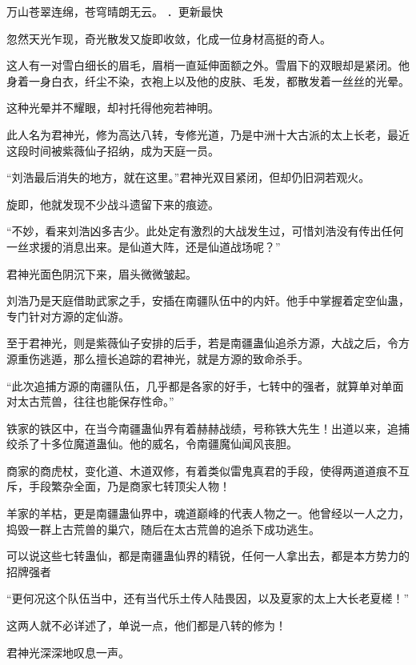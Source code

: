 
\begin{this_body}



万山苍翠连绵，苍穹晴朗无云。 ．更新最快

忽然天光乍现，奇光散发又旋即收敛，化成一位身材高挺的奇人。

这人有一对雪白细长的眉毛，眉梢一直延伸面额之外。雪眉下的双眼却是紧闭。他身着一身白衣，纤尘不染，衣袍上以及他的皮肤、毛发，都散发着一丝丝的光晕。

这种光晕并不耀眼，却衬托得他宛若神明。

此人名为君神光，修为高达八转，专修光道，乃是中洲十大古派的太上长老，最近这段时间被紫薇仙子招纳，成为天庭一员。

“刘浩最后消失的地方，就在这里。”君神光双目紧闭，但却仍旧洞若观火。

旋即，他就发现不少战斗遗留下来的痕迹。

“不妙，看来刘浩凶多吉少。此处定有激烈的大战发生过，可惜刘浩没有传出任何一丝求援的消息出来。是仙道大阵，还是仙道战场呢？”

君神光面色阴沉下来，眉头微微皱起。

刘浩乃是天庭借助武家之手，安插在南疆队伍中的内奸。他手中掌握着定空仙蛊，专门针对方源的定仙游。

至于君神光，则是紫薇仙子安排的后手，若是南疆蛊仙追杀方源，大战之后，令方源重伤逃遁，那么擅长追踪的君神光，就是方源的致命杀手。

“此次追捕方源的南疆队伍，几乎都是各家的好手，七转中的强者，就算单对单面对太古荒兽，往往也能保存性命。”

铁家的铁区中，在当今南疆蛊仙界有着赫赫战绩，号称铁大先生！出道以来，追捕绞杀了十多位魔道蛊仙。他的威名，令南疆魔仙闻风丧胆。

商家的商虎杖，变化道、木道双修，有着类似雷鬼真君的手段，使得两道道痕不互斥，手段繁杂全面，乃是商家七转顶尖人物！

羊家的羊枯，更是南疆蛊仙界中，魂道巅峰的代表人物之一。他曾经以一人之力，捣毁一群上古荒兽的巢穴，随后在太古荒兽的追杀下成功逃生。

可以说这些七转蛊仙，都是南疆蛊仙界的精锐，任何一人拿出去，都是本方势力的招牌强者

“更何况这个队伍当中，还有当代乐土传人陆畏因，以及夏家的太上大长老夏槎！”

这两人就不必详述了，单说一点，他们都是八转的修为！

君神光深深地叹息一声。


\end{this_body}
